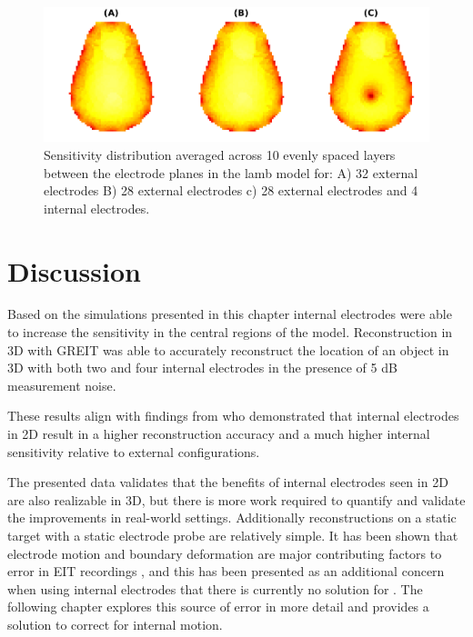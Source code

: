 \begin{figure}[H]
\centering
\includegraphics[width=\columnwidth]{chapter6-internal_electrodes/imgs/lamb_sensitivity_profiles.pdf}
\caption[Sensitivity distribution in a lamb model]{\label{fig:sens_example}%
Sensitivity distribution averaged across 10 evenly spaced layers
between the electrode planes in the lamb model for: 
A) 32 external electrodes 
B) 28 external electrodes 
c) 28 external electrodes and 4 internal electrodes.
}
\end{figure}

\section{Discussion}

Based on the simulations presented in this chapter 
internal electrodes were able to increase the sensitivity in 
the central regions of the model. 
Reconstruction in 3D with GREIT was able to accurately 
reconstruct the location of an object in 3D with both 
two and four internal electrodes in the presence of 5 dB 
measurement noise. 

These results align with findings 
from 
who demonstrated that internal electrodes in 2D 
result in a higher reconstruction accuracy and 
a much higher internal sensitivity relative to external configurations.

The presented data validates that the benefits of internal electrodes seen in 2D
are also realizable in 3D, but there is more 
work required to quantify and validate the improvements in real-world settings. 
Additionally reconstructions on a static target with a static electrode probe
are relatively simple. It has been shown that electrode motion and boundary
deformation are major contributing factors to error in EIT 
recordings \parencite{boyle_impact_2011,grychtol_impact_2012}, and this 
has been presented as an additional concern when using internal electrodes
that there is currently no solution for \parencite{nguyen_electrical_2020}.
The following chapter explores this source of error in more detail and 
provides a solution to correct for internal motion.

